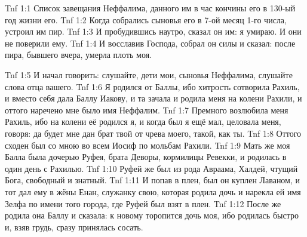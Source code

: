 \vs Tnf 1:1
Список завещания Неффалима,
данного им в час кончины его в 130-ый год жизни его.
\vs Tnf 1:2
Когда собрались сыновья его в 7-ой месяц 1-го числа, устроил им пир.
\vs Tnf 1:3
И пробудившись наутро, сказал он им:
я умираю.
И они не поверили ему.
\vs Tnf 1:4
И восславив Господа, собрал он силы и сказал:
после пира, бывшего вчера, умерла плоть моя.

\vs Tnf 1:5
И начал говорить:
слушайте, дети мои, сыновья Неффалима, слушайте слова отца вашего.
\vs Tnf 1:6
Я родился от Баллы, ибо хитрость сотворила Рахиль,
и вместо себя дала Баллу Иакову,
и та зачала и родила меня на колени Рахили,
и оттого наречено мне было имя Неффалим.
\vs Tnf 1:7
Премного возлюбила меня Рахиль, ибо на колени её родился я,
и когда был я ещё мал, целовала меня, говоря:
да будет мне дан брат твой от чрева моего, такой, как ты.
\vs Tnf 1:8
Оттого сходен был со мною во всем Иосиф по мольбам Рахили.
\vs Tnf 1:9
Мать же моя Балла была дочерью Руфея, брата Деворы,
кормилицы Ревекки, и родилась в один день с Рахилью.
\vs Tnf 1:10
Руфей же был из рода Авраама, Халдей,
чтущий Бога, свободный и знатный.
\vs Tnf 1:11
И попав в плен, был он куплен Лаваном,
и тот дал ему в жёны Енан, служанку свою,
которая родила дочь и нарекла ей имя Зелфа по имени того города,
где Руфей был взят в плен.
\vs Tnf 1:12
После же родила она Баллу и сказала:
к новому торопится дочь моя,
ибо родилась быстро и, взяв грудь,
сразу принялась сосать.

